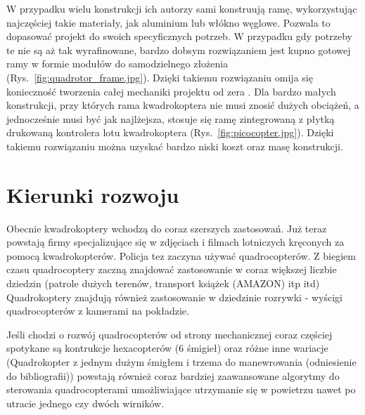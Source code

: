 W przypadku wielu konstrukcji ich autorzy sami konstruują ramę, wykorzystując najczęściej takie materiały, jak aluminium lub włókno węglowe. Pozwala to dopasować projekt do swoich specyficznych potrzeb. W przypadku gdy potrzeby te nie są aż tak wyrafinowane, bardzo dobsym rozwiązaniem jest kupno gotowej ramy w formie modułów do samodzielnego złożenia (Rys.~\ref{fig:quadrotor_frame.jpg}). Dzięki takiemu rozwiązaniu omija się konieczność tworzenia całej mechaniki projektu od zera . Dla bardzo małych konstrukcji, przy których rama kwadrokoptera nie musi znosić dużych obciążeń, a jednocześnie musi być jak najlżejsza, stosuje się ramę zintegrowaną z płytką drukowaną kontrolera lotu kwadrokoptera (Rys.~\ref{fig:picocopter.jpg}). Dzięki takiemu rozwiązaniu można uzyskać bardzo niski koszt oraz masę konstrukcji. 


\section{Kierunki rozwoju}

Obecnie kwadrokoptery wchodzą do coraz szerszych zastosowań. Już teraz powstają firmy specjalizujące się w zdjęciach i filmach lotniczych kręconych za pomocą kwadrokopterów. Policja tez zaczyna używać quadrocopterów. Z biegiem czasu quadrocoptery zaczną znajdować zastosowanie w coraz większej liczbie dziedzin (patrole dużych terenów, transport książek (AMAZON) itp itd) Quadrokoptery znajdują również zastosowanie w dziedzinie rozrywki - wyścigi quadrocopterów z kamerami na pokładzie.

Jeśli chodzi o rozwój quadrocopterów od strony mechanicznej coraz częściej spotykane są kontrukcje hexacopterów (6 śmigieł) oraz różne inne wariacje (Quadrokopter z jednym dużym śmigłem i trzema do manewrowania (odniesienie do bibliografii)) powstają również coraz bardziej zaawansowane algorytmy do sterowania quadrocopterami umożliwiające utrzymanie się w powietrzu nawet po utracie jednego czy dwóch wirników.
